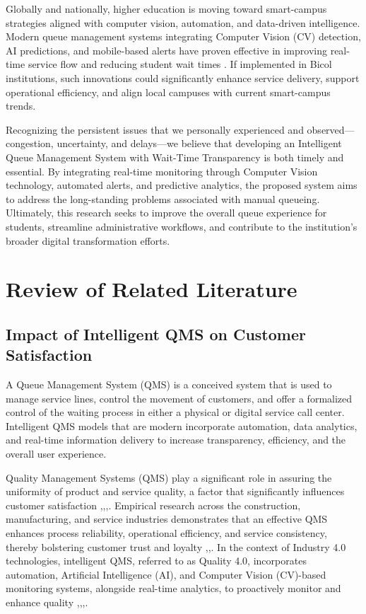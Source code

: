 \documentclass{research}
\begin{document}
Globally and nationally, higher education is moving toward smart-campus strategies aligned with computer vision, automation, and data-driven intelligence. Modern queue management systems integrating Computer Vision (CV) detection, AI predictions, and mobile-based alerts have proven effective in improving real-time service flow and reducing student wait times \cite{ref89}. If implemented in Bicol institutions, such innovations could significantly enhance service delivery, support operational efficiency, and align local campuses with current smart-campus trends.

Recognizing the persistent issues that we personally experienced and observed—congestion, uncertainty, and delays—we believe that developing an Intelligent Queue Management System with Wait-Time Transparency is both timely and essential. By integrating real-time monitoring through Computer Vision technology, automated alerts, and predictive analytics, the proposed system aims to address the long-standing problems associated with manual queueing. Ultimately, this research seeks to improve the overall queue experience for students, streamline administrative workflows, and contribute to the institution's broader digital transformation efforts.

\section{Review of Related Literature}
\subsection{Impact of Intelligent QMS on Customer Satisfaction}

A Queue Management System (QMS) is a conceived system that is used to manage service lines, control the movement of customers, and offer a formalized control of the waiting process in either a physical or digital service call center. Intelligent QMS models that are modern incorporate automation, data analytics, and real-time information delivery to increase transparency, efficiency, and the overall user experience.

Quality Management Systems (QMS) play a significant role in assuring the uniformity of product and service quality, a factor that significantly influences customer satisfaction \cite{ref6},\cite{ref7},\cite{ref8},\cite{ref9}. Empirical research across the construction, manufacturing, and service industries demonstrates that an effective QMS enhances process reliability, operational efficiency, and service consistency, thereby bolstering customer trust and loyalty \cite{ref3},\cite{ref10},\cite{ref11}. In the context of Industry 4.0 technologies, intelligent QMS, referred to as Quality 4.0, incorporates automation, Artificial Intelligence (AI), and Computer Vision (CV)-based monitoring systems, alongside real-time analytics, to proactively monitor and enhance quality \cite{ref12},\cite{ref13},\cite{ref14},\cite{ref15}.
\end{document}
